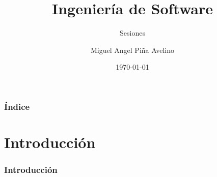 \documentclass{beamer}
\title[UNAM]{Ingeniería de Software}
\subtitle{Sesiones}
\author[Miguel]{Miguel Angel Piña Avelino}
\institute[UNAM]{
  Facultad de ciencias, UNAM
}
\date{\today}
\begin{document}
\frame{\titlepage}

\begin{frame}
  \frametitle{Índice}
  \tableofcontents
\end{frame}

\section{Introducción}
\begin{frame}
  \frametitle{Introducción}

\end{frame}
\end{document}

